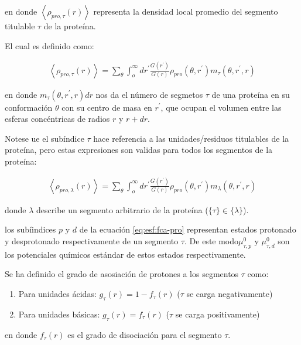 \noindent en donde $\left<\rho_{pro,\tau}(r)\right>$ representa la densidad local promedio del segmento titulable $\tau$ de la prote\'ina.

El cual es definido como:


\begin{align}
	\left<\rho_{pro,\tau}(r)\right> = \sum_\theta \int_o^\infty dr^\prime \frac{G(r^\prime)}{G(r)} \rho_{pro}(\theta,r^\prime)m_\tau(\theta,r^\prime,r)
	\label{eq:esf:segments-pro-vector}
\end{align}


\noindent en donde $m_\tau(\theta,r^\prime,r) dr$  nos da el n\'umero de segmetos $\tau$  de una prote\'ina en su conformaci\'on $\theta$ con su centro de masa en $r^\prime$, que ocupan el volumen entre las esferas conc\'entricas de radios $r$ y $r + dr$.



Notese ue el sub\'indice  $\tau$ hace referencia a las unidades/residuos titulables de la prote\'ina, pero estas expresiones son validas para todos los segmentos de la prote\'ina:

\begin{align}
	\left<\rho_{pro,\lambda}(r)\right> = \sum_\theta \int_o^\infty dr^\prime \frac{G(r^\prime)}{G(r)} \rho_{pro}(\theta,r^\prime)m_\lambda(\theta,r^\prime,r)
	\label{eq:esf:segments-pro}
\end{align}



\noindent donde $\lambda$  describe un segmento arbitrario de la prote\'ina ($\{\tau\}\in\{\lambda\}$).

los sub\'iindices $p$ y $d$  de la ecuaci\'on \ref{eq:esf:fca-pro} representan estados protonado y desprotonado respectivamente de un segmento $\tau$. 
De este modo$\mu^0_{\tau,p}$ y $\mu^0_{\tau,d}$  son los potenciales qu\'imicos est\'andar de estos estados respectivamente.

Se ha definido el grado de asosiaci\'on de protones a los segmentos $\tau$
como: 
 
\begin{enumerate}
	\item Para unidades \'acidas: $g_\tau(r) = 1-f_\tau(r)$ ($\tau$ se carga negativamente)
	\item Para unidades b\'asicas: $g_\tau(r) = f_\tau(r)$ ($\tau$ se carga positivamente)
\end{enumerate}
\noindent en donde $f_\tau(r)$  es el grado de disociaci\'on  para el segmento $\tau$.

